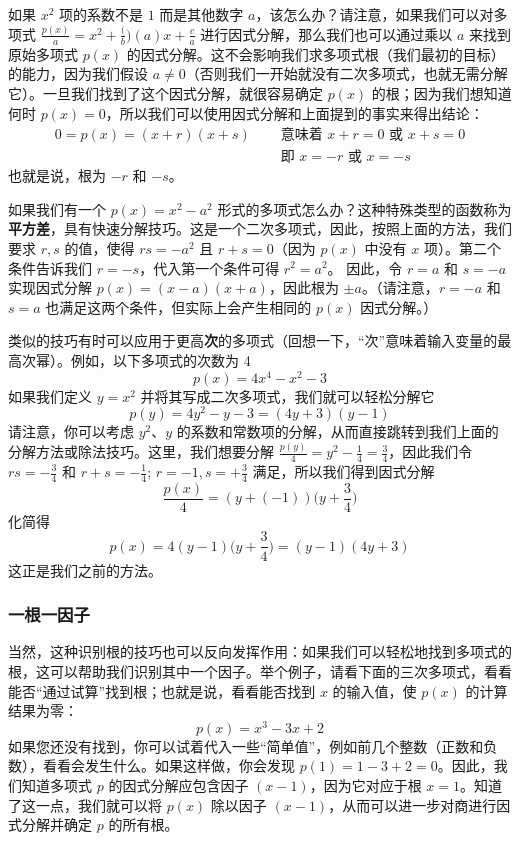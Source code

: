 如果 $x^2$ 项的系数不是 $1$ 而是其他数字 $a$，该怎么办？请注意，如果我们可以对多项式 $\frac{p(x)}{a} = x^2+\frac(b)(a)x+\frac{c}{a}$ 进行因式分解，那么我们也可以通过乘以 $a$ 来找到原始多项式 $p(x)$ 的因式分解。这不会影响我们求多项式根（我们最初的目标）的能力，因为我们假设 $a \ne 0$（否则我们一开始就没有二次多项式，也就无需分解它）。一旦我们找到了这个因式分解，就很容易确定 $p(x)$ 的根；因为我们想知道何时 $p(x) = 0$，所以我们可以使用因式分解和上面提到的事实来得出结论：
\begin{align*}
    0 = p(x) = (x + r)(x + s) & \quad \text{ 意味着 } x + r = 0 \text{ 或 } x + s = 0 \\
    & \quad \text{ 即 } x = -r \text{ 或 } x = -s
\end{align*}
也就是说，根为 $-r$ 和 $-s$。

如果我们有一个 $p(x) = x^2 - a^2$ 形式的多项式怎么办？这种特殊类型的函数称为\textbf{平方差}，具有快速分解技巧。这是一个二次多项式，因此，按照上面的方法，我们要求 $r,s$ 的值，使得 $rs = -a^2$ 且 $r + s = 0$（因为 $p(x)$ 中没有 $x$ 项）。第二个条件告诉我们 $r = -s$，代入第一个条件可得 $r^2 = a^2$。 因此，令 $r = a$ 和 $s = -a$ 实现因式分解 $p(x) = (x - a)(x + a)$，因此根为 $\pm a$。（请注意，$r = -a$ 和 $s = a$ 也满足这两个条件，但实际上会产生相同的 $p(x)$ 因式分解。）

类似的技巧有时可以应用于更高\textbf{次}的多项式（回想一下，``次''意味着输入变量的最高次幂）。例如，以下多项式的次数为 4
\[p(x) = 4x^4 - x^2 - 3\]
如果我们定义 $y = x^2$ 并将其写成二次多项式，我们就可以轻松分解它
\[p(y) = 4y^2 - y - 3 = (4y + 3)(y - 1)\]
请注意，你可以考虑 $y^2$、$y$ 的系数和常数项的分解，从而直接跳转到我们上面的分解方法或除法技巧。这里，我们想要分解 $\frac{p(y)}{4} = y^2-\frac{1}{4}=\frac{3}{4}$，因此我们令 $rs = -\frac{3}{4}$ 和 $r + s =-\frac{1}{4}$; $r=-1, s=+\frac{3}{4}$ 满足，所以我们得到因式分解
\[\frac{p(x)}{4} = (y+(-1))\Big(y+\frac{3}{4}\Big)\]
化简得
\[p(x) = 4(y-1)\Big(y+\frac{3}{4}\Big) = (y-1)(4y+3)\]
这正是我们之前的方法。

\subsubsection*{一根一因子}

当然，这种识别根的技巧也可以反向发挥作用：如果我们可以轻松地找到多项式的根，这可以帮助我们识别其中一个因子。举个例子，请看下面的三次多项式，看看能否``通过试算''找到根；也就是说，看看能否找到 $x$ 的输入值，使 $p(x)$ 的计算结果为零：
\[p(x) = x^3 - 3x + 2\]
如果您还没有找到，你可以试着代入一些``简单值''，例如前几个整数（正数和负数），看看会发生什么。如果这样做，你会发现 $p(1) = 1 - 3 + 2 = 0$。因此，我们知道多项式 $p$ 的因式分解应包含因子 $(x - 1)$，因为它对应于根 $x = 1$。知道了这一点，我们就可以将 $p(x)$ 除以因子 $(x - 1)$，从而可以进一步对商进行因式分解并确定 $p$ 的所有根。

